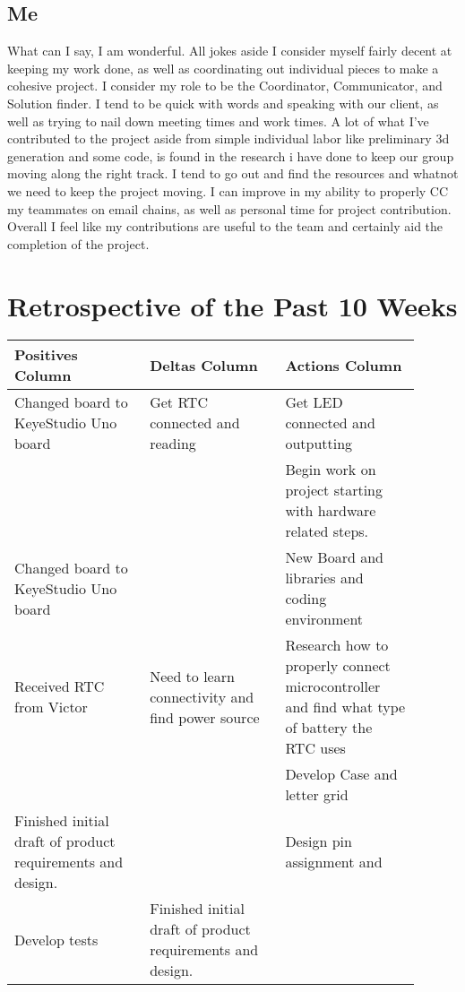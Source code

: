 \documentclass[onecolumn, draftclsnofoot,10pt, compsoc]{IEEEtran}
\begin{document}
\subsection{Me}
What can I say, I am wonderful.
All jokes aside I consider myself fairly decent at keeping my work done, as well as coordinating out individual pieces to make a cohesive project.
I consider my role to be the Coordinator, Communicator, and Solution finder.
I tend to be quick with words and speaking with our client, as well as trying to nail down meeting times and work times.
A lot of what I've contributed to the project aside from simple individual labor like preliminary 3d generation and some code, is found in the research i have done to keep our group moving along the right track.
I tend to go out and find the resources and whatnot we need to keep the project moving.
I can improve in my ability to properly CC my teammates on email chains, as well as personal time for project contribution.
Overall I feel like my contributions are useful to the team and certainly aid the completion of the project.

\newpage
\section{Retrospective of the Past 10 Weeks}
\vspace{2mm}
\begin{center}
\begin{tabular}{| p{0.3\linewidth} | p{0.3\linewidth} | p{0.3\linewidth} |}
\hline
Positives Column &
Deltas Column &
Actions Column \\
\hline
Changed board to KeyeStudio Uno board &
Get RTC connected and reading &
Get LED connected and outputting \\
\hline
 &
 &
Begin work on project starting with hardware related steps.  \\
\hline
Changed board to KeyeStudio Uno board &
 &
New Board and libraries and coding environment \\
\hline
Received RTC from Victor &
Need to learn connectivity and find power source &
Research how to properly connect microcontroller and find what type of battery the RTC uses \\
\hline
 &
 &
Develop Case and letter grid \\
\hline
Finished initial draft of product requirements and design. &
&
Design pin assignment and \\
\hline
Develop tests &
Finished initial draft of product requirements and design. &
\\
\hline


\end{tabular}
\end{center}
\end{document}
